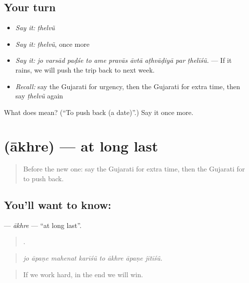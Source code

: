 \subsection*{Your turn}
\begin{itemize}
\raggedright
  \item \emph{Say it:} \emph{ṭhelvũ}
  \item \emph{Say it:} \emph{ṭhelvũ}, once more
  \item \emph{Say it:} \emph{jo varsād paḍśe to ame pravās āvtā aṭhvāḍiyā par ṭhelīśũ.} — If it rains, we will push the trip back to next week.
  \item \emph{Recall:} say the Gujarati for urgency, then the Gujarati for extra time, then say \emph{ṭhelvũ} again
\end{itemize}

\begin{tcolorbox}[breakable,colback=teal!4,colframe=teal!35!black,title={Before you move on}]
What does  mean? (\textquotedblleft{}To push back (a date)\textquotedblright{}.) Say it once more.
\end{tcolorbox}
\section[\texorpdfstring{\gu{આખરે} (ākhre)}{આખરે (ākhre)}]{ (ākhre) — at long last}

\label{lesson:GU-C530-akhre}



\begin{quote}
Before the new one: say the Gujarati for extra time, then the Gujarati for to push back.
\end{quote}

\subsection*{You'll want to know: }
\textbf{} — \emph{ākhre} — \textquotedblleft{}at long last\textquotedblright{}.

\begin{quote}
       .
\end{quote}

\begin{quote}
\emph{jo āpaṇe mahenat karīśũ to ākhre āpaṇe jītīśũ.}
\end{quote}

\begin{quote}
If we work hard, in the end we will win.
\end{quote}

